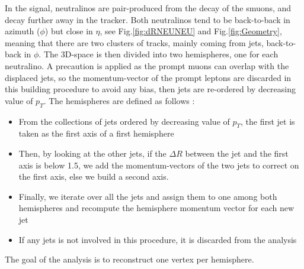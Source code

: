 \documentclass{cernatlasnote}
\begin{document}
  In the signal, neutralinos are pair-produced from the decay of the smuons, and decay further away in the tracker. Both neutralinos tend to be back-to-back in azimuth ($\phi$) but close in $\eta$, see Fig.\ref{fig:dRNEUNEU} and Fig.\ref{fig:Geometry}, meaning that there are two clusters of tracks, mainly coming from jets, back-to-back in $\phi$. The 3D-space is then divided into two hemispheres, one for each neutralino. A precaution is applied as the prompt muons can overlap with the displaced jets, so the momentum-vector of the prompt leptons are discarded in this building procedure to avoid any bias, then jets are re-ordered by decreasing value of $p_T$. The hemispheres are defined as follows : 
    \begin{itemize}
        \item From the collections of jets ordered by decreasing value of $p_T$, the first jet is taken as the first axis of a first hemisphere
        \item Then, by looking at the other jets, if the $\Delta R$ between the jet and the first axis is below 1.5, we add the momentum-vectors of the two jets to correct on the first axis, else we build a second axis.
        \item  Finally, we iterate over all the jets and assign them to one among both hemispheres and recompute the hemisphere momentum vector for each new jet
        \item If any jets is not involved in this procedure, it is discarded from the analysis
    \end{itemize}


The goal of the analysis is to reconstruct one vertex per hemisphere.
\end{document}
